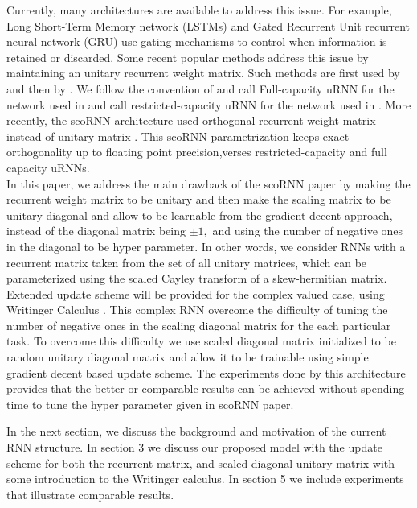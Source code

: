 \documentclass[letterpaper]{article} %
\begin{document}
\noindent Currently, many architectures are available to address this issue. For example, Long Short-Term Memory network (LSTMs) \cite{Hochreiter97} and Gated Recurrent Unit recurrent neural network (GRU) \cite{Cho14}  use gating mechanisms to control when information is retained  or  discarded. Some recent popular methods address this issue by maintaining an unitary recurrent weight matrix. Such methods are first used by \cite{Arjo16} and then by \cite{Wisdom16}. We follow the convention of \cite{Wisdom16} and call Full-capacity uRNN for the network used in \cite{Wisdom16} and call restricted-capacity uRNN for the network used in \cite{Arjo16}. More recently, the  scoRNN architecture  used orthogonal recurrent weight matrix instead of unitary matrix \cite{kyle17}. This scoRNN parametrization keeps exact orthogonality up to floating point precision,verses restricted-capacity and full capacity uRNNs.\\ 

\noindent In this paper, we address the main drawback of the scoRNN paper by making the recurrent weight matrix to be unitary and then make the scaling matrix to be unitary diagonal and allow to be learnable from the gradient decent approach, instead of the diagonal matrix being $\pm 1,$ and using the number of negative ones in the diagonal to be hyper parameter. In other words, we consider RNNs with a recurrent matrix taken from the set of all unitary matrices, which can be parameterized using the scaled Cayley transform of a skew-hermitian matrix. Extended update scheme will be provided for the complex valued case, using Writinger Calculus \cite{Kreutzdelgado09}. This complex RNN overcome the difficulty of tuning the number of negative ones in the scaling diagonal matrix for the each particular task. To overcome this difficulty we use scaled diagonal matrix initialized to be random unitary diagonal matrix and allow it to be trainable using simple gradient decent based update scheme. The experiments done by this architecture provides that the better or comparable results can be achieved without spending time to tune the hyper parameter given in scoRNN paper.

\noindent In the next section,  we discuss the background and motivation of the current RNN structure. In section 3 we discuss our proposed model with the update scheme for both the recurrent matrix, and scaled diagonal unitary matrix with some introduction to the Writinger calculus. In section 5 we include experiments that illustrate comparable results.
\end{document}
